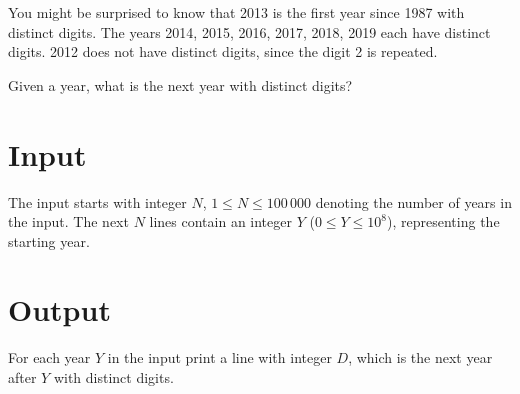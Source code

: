 
You might be surprised to know that 2013 is the first year since 1987 with
distinct digits. The years 2014, 2015, 2016, 2017, 2018, 2019 each have
distinct digits. 2012 does not have distinct digits, since the digit 2 is
repeated.

Given a year, what is the next year with distinct digits?

\section*{Input}
The input starts with integer $N$, $1\leq N\leq 100\,000$ denoting the number of years in the input.
The next $N$ lines contain an integer $Y$ ($0\leq Y\leq 10^8$), representing the starting year.

\section*{Output}
For each year $Y$ in the input print a line with integer $D$, which is the next
year after $Y$ with distinct digits.
